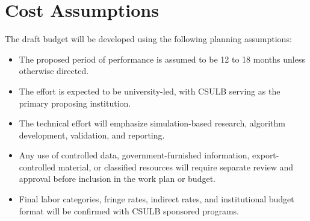 \section{Cost Assumptions}

The draft budget will be developed using the following planning assumptions:

\begin{itemize}
  \item The proposed period of performance is assumed to be 12 to 18 months unless otherwise directed.
  \item The effort is expected to be university-led, with CSULB serving as the primary proposing institution.
  \item The technical effort will emphasize simulation-based research, algorithm development, validation, and reporting.
  \item Any use of controlled data, government-furnished information, export-controlled material, or classified resources will require separate review and approval before inclusion in the work plan or budget.
  \item Final labor categories, fringe rates, indirect rates, and institutional budget format will be confirmed with CSULB sponsored programs.
\end{itemize}
